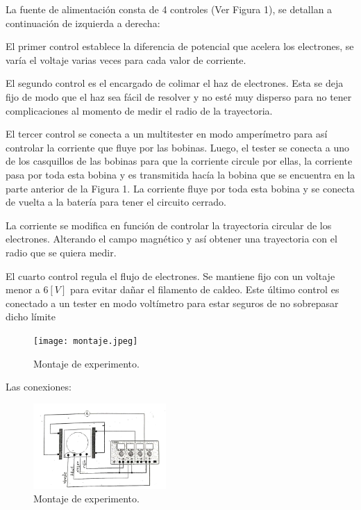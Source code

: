 \documentclass[a4paper,twocolumn,10pt]{article}
\begin{document}
La fuente de alimentación consta de 4 controles (Ver Figura 1), se detallan a continuación de izquierda a derecha:

El primer control establece la diferencia de potencial que acelera los electrones, se varía el voltaje varias veces para cada valor de corriente.

El segundo control es el encargado de colimar el haz de electrones. Esta se deja fijo de modo que el haz sea fácil de resolver y no esté muy disperso para no tener complicaciones al momento de medir el radio de la trayectoria.

El tercer control se conecta a un multitester en modo amperímetro para así controlar la corriente que fluye por las bobinas. Luego, el tester se conecta a uno de los casquillos de las bobinas para que la corriente circule por ellas, la corriente pasa por toda esta bobina y es transmitida hacía la bobina que se encuentra en la parte anterior de la Figura 1. La corriente fluye por toda esta bobina y se conecta de vuelta a la batería para tener el circuito cerrado.

La corriente se modifica en función de controlar la trayectoria circular de los electrones. Alterando el campo magnético y así obtener una trayectoria con el radio que se quiera medir.

El cuarto control regula el flujo de electrones. Se mantiene fijo con un voltaje menor a $6[V]$ para evitar dañar el filamento de caldeo. Este último control es conectado a un tester en modo voltímetro para estar seguros de no sobrepasar dicho límite

\begin{figure}[H]
    \centering
    \texttt{[image: montaje.jpeg]}
    \caption{Montaje de experimento.}
    \label{fig:montaje_foto_real}
\end{figure}

Las conexiones:
\begin{figure}[H]
    \centering
    \includegraphics[width=0.45\textwidth]{Imagenes/QM/hazfinoafuente.png}
    \caption{Montaje de experimento.}
    \label{fig:montaje_hazfinofuente}
\end{figure}
\end{document}
